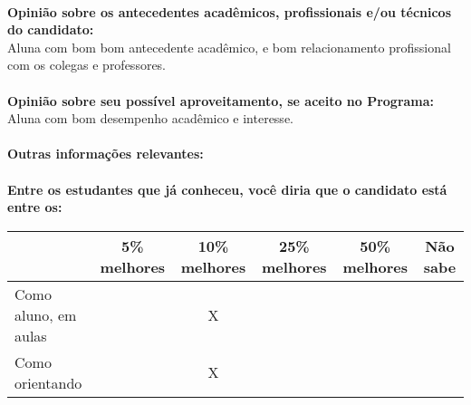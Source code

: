 \documentclass[11pt]{article}
\begin{document}
\\
\textbf{Opinião sobre os antecedentes acadêmicos, profissionais e/ou técnicos do candidato:}
\\Aluna com bom bom antecedente acadêmico, e bom relacionamento profissional com os colegas e professores.\\
\\
\textbf{Opinião sobre seu possível aproveitamento, se aceito no Programa:}
\\Aluna com bom desempenho acadêmico e interesse.\\ 
\\
\textbf{Outras informações relevantes:} \\
\\[0.3cm]
\textbf{Entre os estudantes que já conheceu, você diria que o candidato está entre os:}
\\
\begin{tabular}{|l|c|c|c|c|c|}
\hline
 & 5\% melhores & 10\% melhores & 25\% melhores & 50\% melhores & Não sabe \\
\hline
Como aluno, em aulas &  & X &  &  & \\
\hline
Como orientando &  & X &  &  & \\
\hline
\end{tabular}
\end{document}
